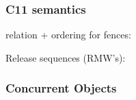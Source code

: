\subsubsection*{C11 semantics}


\hSep

 relation + ordering for fences:

\hSep

Release sequences (RMW's):

\hSep

\subsubsection*{Concurrent Objects}

